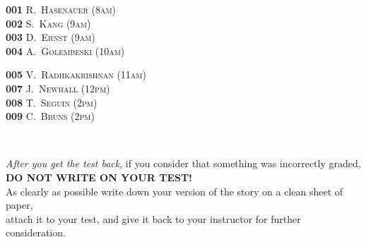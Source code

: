 \documentclass{article}
\begin{document}
{\normalsize
\begin{minipage}[t]{3.0in}
    \textbf{001} \textsc{ R.\ Hasenauer         \dotfill  (8am) }
  \\[4pt]
    \textbf{002} \textsc{ S.\ Kang         \dotfill  (9am) }
  \\[4pt]
    \textbf{003} \textsc{ D.\ Ernst         \dotfill  (9am) }
  \\[4pt]
    \textbf{004} \textsc{ A.\ Golembeski         \dotfill  (10am) }  
\end{minipage} \hfill
\begin{minipage}[t]{3.0in}
    \textbf{005} \textsc{ V.\ Radhkakrishnan          \dotfill  (11am) }
  \\[4pt]
    \textbf{007} \textsc{ J.\ Newhall        \dotfill  (12pm) }
  \\[4pt]
    \textbf{008} \textsc{ T.\ Seguin        \dotfill  (2pm) }
  \\[4pt]
    \textbf{009} \textsc{ C.\ Bruns        \dotfill  (2pm) }    
\end{minipage} \hfill \\

\vspace{1cm}

\begin{centering}
  \textsl{After you get the test back},
  if you consider that something was incorrectly graded,     \\
  \textbf{DO NOT WRITE ON YOUR TEST!}                        \\
  As clearly as possible write down your version
  of the story on a clean sheet of paper,                    \\
  attach it to your test, and give it back to your
  instructor for further consideration.                      \\
\end{centering}

\vspace{1cm}

}
\end{document}
